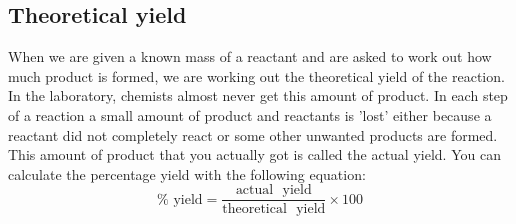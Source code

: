 \subsection*{Theoretical yield}
\label{m38712*eip-943}When we are given a known mass of a reactant and are asked to work out how much product is formed, we are working out the theoretical yield of the reaction. In the laboratory, chemists almost never get this amount of product. In each step of a reaction a small amount of product and reactants is 'lost' either because a reactant did not completely react or some other unwanted products are formed. This amount of product that you actually got is called the actual yield. You can calculate the percentage yield with the following equation:
\begin{equation*}
 \text{\% ~yield} = \frac{\text{actual ~yield}}{\text{theoretical ~yield}} \times 100
\end{equation*}

